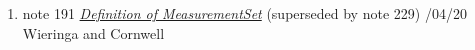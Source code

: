 \begin{enumerate}
\item
note 191
\href{191.html}{\textit{Definition of MeasurementSet}} (superseded by
  note 229)
/04/20 Wieringa and Cornwell

\end{enumerate}
